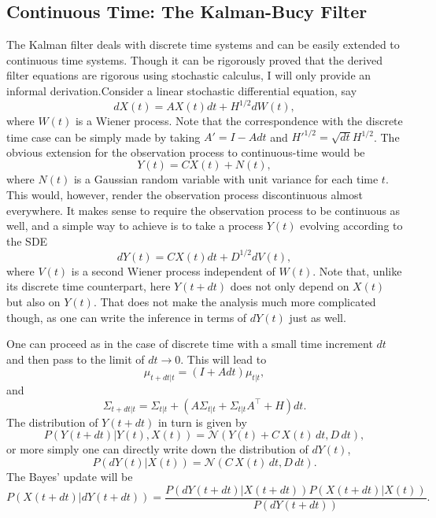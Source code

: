 {\subsection{Continuous Time: The Kalman-Bucy Filter}

The Kalman filter deals with discrete time systems and can be easily extended to continuous time systems. Though it can be rigorously proved that the derived filter 
equations are rigorous using stochastic calculus, I will only provide an informal derivation.Consider a linear stochastic differential 
equation, say
\begin{equation}
\label{eq:OU_sde}
dX(t) = A X(t) dt + H^{1/2} dW(t),
\end{equation}
where $W(t)$ is a Wiener process. Note that the correspondence with the discrete time case can be simply made by taking $A'=I - A dt$ and 
$H'^{1/2} = \sqrt{dt} H^{1/2}$. The obvious extension for the observation process to continuous-time would be
\[
Y(t) = CX(t) + N(t),
\]
where $N(t)$ is a Gaussian random variable with unit variance for each time $t$. This would, however, render the observation process discontinuous almost 
everywhere. It makes sense to require the observation process to be continuous as well, and a simple way to achieve is to take a process $Y(t)$ evolving according
to the SDE
\begin{equation}
dY(t) = C X(t) dt + D^{1/2} dV(t),
\end{equation}
where $V(t)$ is a second Wiener process independent of $W(t)$. Note that, unlike its discrete time counterpart, here $Y(t+dt)$ does not only depend on $X(t)$ but also on $Y(t)$. That does not make the analysis much more complicated though, as one can write the inference in terms of $dY(t)$ just as well.\par
One can proceed as in the case of discrete time with a small time increment $dt$ and then pass to the limit of $dt\to 0$. This will lead to
\[
\mu_{t+dt|t} = (I+A dt)\mu_{t|t},
\]
and
\[
\Sigma_{t+dt|t} = \Sigma_{t|t}  + \left(A\Sigma_{t|t} + \Sigma_{t|t} A^\top + H\right) dt.
\]
The distribution of $Y(t+dt)$ in turn is given by
\[
P(Y(t+dt)|Y(t),X(t)) = \mathcal{N}\left(Y(t) + C\,X(t)\, dt, D\, dt\right),
\]
or more simply one can directly write down the distribution of $dY(t)$,
\[
P(dY(t)|X(t)) = \mathcal{N}\left(C\,X(t)\,dt,D\,dt\right).
\]
The Bayes' update will be
\[
P(X(t+dt)|dY(t+dt)) = \frac{P(dY(t+dt)|X(t+dt)) P(X(t+dt)|X(t))}{P(dY(t+dt))}. %
\]}
